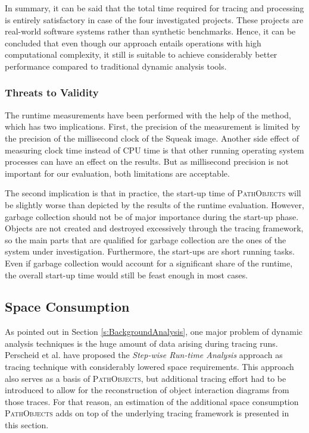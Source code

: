 In summary, it can be said that the total time required for tracing and processing is entirely satisfactory in case of the four investigated projects.
These projects are real-world software systems rather than synthetic benchmarks.
Hence, it can be concluded that even though our approach entails operations with high computational complexity, it still is suitable to achieve considerably better performance compared to traditional dynamic analysis tools.

\subsubsection{Threats to Validity}
The runtime measurements have been performed with the help of the  method, which has two implications.
First, the precision of the measurement is limited by the precision of the millisecond clock of the Squeak image.
Another side effect of measuring clock time instead of CPU time is that other running operating system processes can have an effect on the results.
But as millisecond precision is not important for our evaluation, both limitations are acceptable.

The second implication is that in practice, the start-up time of \textsc{PathObjects} will be slightly worse than depicted by the results of the runtime evaluation.
However, garbage collection should not be of major importance during the start-up phase.
Objects are not created and destroyed excessively through the tracing framework, so the main parts that are qualified for garbage collection are the ones of the system under investigation.
Furthermore, the start-ups are short running tasks.
Even if garbage collection would account for a significant share of the runtime, the overall start-up time would still be feast enough in most cases.

\subsection{Space Consumption}
\label{ss:DiscussionSpace}
As pointed out in Section \ref{s:BackgroundAnalysis}, one major problem of dynamic analysis techniques is the huge amount of data arising during tracing runs.
Perscheid et al. have proposed the \emph{Step-wise Run-time Analysis} approach \cite{perscheid_immediacy_2010} as tracing technique with considerably lowered space requirements. 
This approach also serves as a basis of \textsc{PathObjects}, but additional tracing effort had to be introduced to allow for the reconstruction of object interaction diagrams from those traces.
For that reason, an estimation of the additional space consumption \textsc{PathObjects} adds on top of the underlying tracing framework is presented in this section.

